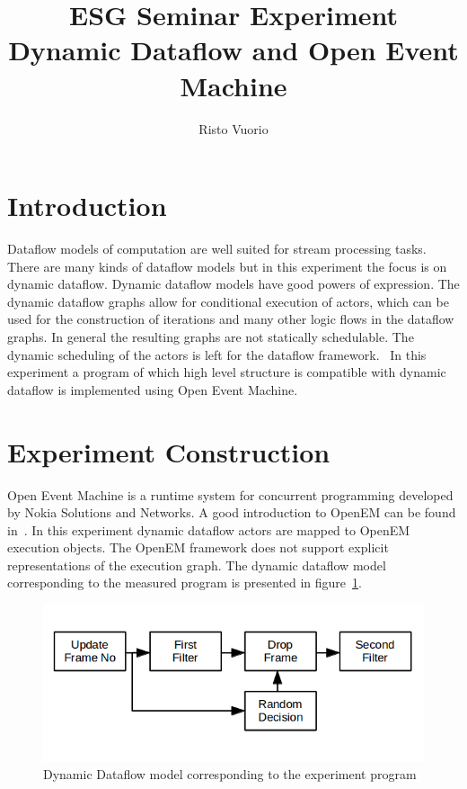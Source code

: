 \documentclass[a4paper,10pt]{article}
\begin{document}
%
\title{ESG Seminar Experiment \\ Dynamic Dataflow and Open Event Machine}

\author{Risto Vuorio}

\maketitle

\begin{abstract}
\end{abstract}

\section{Introduction}
Dataflow models of computation are well suited for stream processing tasks. There are many kinds of dataflow models but in this experiment the focus is on dynamic dataflow. Dynamic dataflow models have good powers of expression. The dynamic dataflow graphs allow for conditional execution of actors, which can be used for the construction of iterations and many other logic flows in the dataflow graphs. In general the resulting graphs are not statically schedulable. The dynamic scheduling of the actors is left for the dataflow framework.~\cite{semmapaperi} In this experiment a program of which high level structure is compatible with dynamic dataflow is implemented using Open Event Machine.

\section{Experiment Construction}
Open Event Machine is a runtime system for concurrent programming developed by Nokia Solutions and Networks. A good introduction to OpenEM can be found in~\cite{dippa}. In this experiment dynamic dataflow actors are mapped to OpenEM execution objects. The OpenEM framework does not support explicit representations of the execution graph. The dynamic dataflow model corresponding to the measured program is presented in figure~\ref{fig:ddf_model}. 

\begin{figure}[!h]
    \centering
        \includegraphics[width=30pc]{ddf_model.png}
        \caption{Dynamic Dataflow model corresponding to the experiment program}
        \label{fig:ddf_model}
\end{figure}



\end{document}

